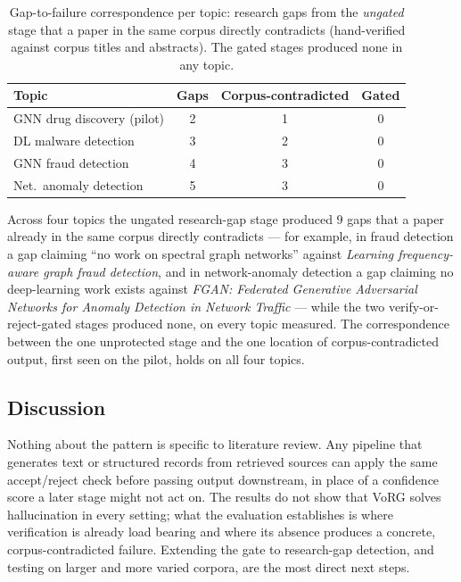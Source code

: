\documentclass[conference]{IEEEtran}
\newcommand{\NumTopics}{four}
\begin{document}
\begin{table}[t]
\centering
\caption{Gap-to-failure correspondence per topic: research gaps from the
\emph{ungated} stage that a paper in the same corpus directly contradicts
(hand-verified against corpus titles and abstracts). The gated stages produced
none in any topic.}
\label{tab:gap2fail}
\begin{tabular}{@{}lccc@{}}
\toprule
Topic & Gaps & Corpus-contradicted & Gated \\
\midrule
GNN drug discovery (pilot) & 2 & 1 & 0 \\
DL malware detection       & 3 & 2 & 0 \\
GNN fraud detection        & 4 & 3 & 0 \\
Net.\ anomaly detection    & 5 & 3 & 0 \\
\bottomrule
\end{tabular}
\end{table}

\noindent
Across \NumTopics{} topics the ungated research-gap stage produced 9 gaps that
a paper already in the same corpus directly contradicts --- for example, in
fraud detection a gap claiming ``no work on spectral graph networks'' against
\emph{Learning frequency-aware graph fraud detection}, and in network-anomaly
detection a gap claiming no deep-learning work exists against \emph{FGAN:
Federated Generative Adversarial Networks for Anomaly Detection in Network
Traffic} --- while the two verify-or-reject-gated stages produced none, on
every topic measured. The correspondence between the one unprotected stage and
the one location of corpus-contradicted output, first seen on the pilot, holds
on all four topics.

\subsection{Discussion}
Nothing about the pattern is specific to literature review. Any pipeline that
generates text or structured records from retrieved sources can apply the same
accept/reject check before passing output downstream, in place of a confidence
score a later stage might not act on. The results do not show that VoRG solves
hallucination in every setting; what the evaluation establishes is where
verification is already load bearing and where its absence produces a concrete,
corpus-contradicted failure. Extending the gate to research-gap detection, and
testing on larger and more varied corpora, are the most direct next steps.
\end{document}
